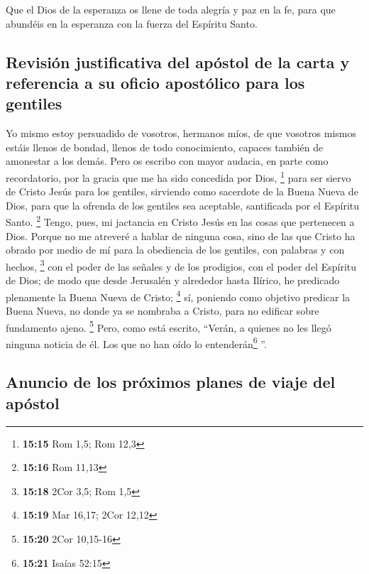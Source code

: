 \begin{paracol}{2}
 Que el Dios de la esperanza os llene de toda alegría y
paz en la fe, para que abundéis en la esperanza con la fuerza del
Espíritu Santo.

\hypertarget{revisiuxf3n-justificativa-del-apuxf3stol-de-la-carta-y-referencia-a-su-oficio-apostuxf3lico-para-los-gentiles}{%
\subsection{Revisión justificativa del apóstol de la carta y referencia
a su oficio apostólico para los
gentiles}\label{revisiuxf3n-justificativa-del-apuxf3stol-de-la-carta-y-referencia-a-su-oficio-apostuxf3lico-para-los-gentiles}}

 Yo mismo estoy persuadido de vosotros, hermanos míos, de
que vosotros mismos estáis llenos de bondad, llenos de todo
conocimiento, capaces también de amonestar a los demás. 
Pero os escribo con mayor audacia, en parte como recordatorio, por la
gracia que me ha sido concedida por Dios, \footnote{\textbf{15:15} Rom
  1,5; Rom 12,3}  para ser siervo de Cristo Jesús para
los gentiles, sirviendo como sacerdote de la Buena Nueva de Dios, para
que la ofrenda de los gentiles sea aceptable, santificada por el
Espíritu Santo. \footnote{\textbf{15:16} Rom 11,13} 
Tengo, pues, mi jactancia en Cristo Jesús en las cosas que pertenecen a
Dios.  Porque no me atreveré a hablar de ninguna cosa,
sino de las que Cristo ha obrado por medio de mí para la obediencia de
los gentiles, con palabras y con hechos, \footnote{\textbf{15:18} 2Cor
  3,5; Rom 1,5}  con el poder de las señales y de los
prodigios, con el poder del Espíritu de Dios; de modo que desde
Jerusalén y alrededor hasta Ilírico, he predicado plenamente la Buena
Nueva de Cristo; \footnote{\textbf{15:19} Mar 16,17; 2Cor 12,12}
 sí, poniendo como objetivo predicar la Buena Nueva, no
donde ya se nombraba a Cristo, para no edificar sobre fundamento ajeno.
\footnote{\textbf{15:20} 2Cor 10,15-16}  Pero, como está
escrito, ``Verán, a quienes no les llegó ninguna noticia de él. Los que
no han oído lo entenderán\footnote{\textbf{15:21} Isaías 52:15} ''.

\hypertarget{anuncio-de-los-pruxf3ximos-planes-de-viaje-del-apuxf3stol}{%
\subsection{Anuncio de los próximos planes de viaje del
apóstol}\label{anuncio-de-los-pruxf3ximos-planes-de-viaje-del-apuxf3stol}}


\end{paracol}
